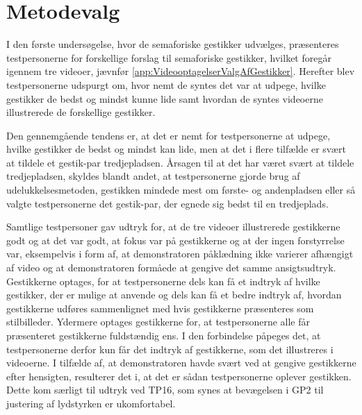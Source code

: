 \section{Metodevalg}
\label{DiskussionMetodevalg}
%
I den første undersøgelse, hvor de semaforiske gestikker udvælges, præsenteres testpersonerne for forskellige forslag til semaforiske gestikker, hvilket foregår igennem tre videoer, jævnfør \autoref{app:VideooptagelserValgAfGestikker}. Herefter blev testpersonerne udspurgt om, hvor nemt de syntes det var at udpege, hvilke gestikker de bedst og mindst kunne lide samt hvordan de syntes videoerne illustrerede de forskellige gestikker.

Den gennemgående tendens er, at det er nemt for testpersonerne at udpege, hvilke gestikker de bedst og mindst kan lide, men at det i flere tilfælde er svært at tildele et gestik-par tredjepladsen. Årsagen til at det har været svært at tildele tredjepladsen, skyldes blandt andet, at testpersonerne gjorde brug af udelukkelsesmetoden, gestikken mindede mest om første- og andenpladsen eller så valgte testpersonerne det gestik-par, der egnede sig bedst til en tredjeplads. 

Samtlige testpersoner gav udtryk for, at de tre videoer illustrerede gestikkerne godt og at det var godt, at fokus var på gestikkerne og at der ingen forstyrrelse var, eksempelvis i form af, at demonstratoren påklædning ikke varierer afhængigt af video og at demonstratoren formåede at gengive det samme ansigtsudtryk. Gestikkerne optages, for at testpersonerne dels kan få et indtryk af hvilke gestikker, der er mulige at anvende og dels kan få et bedre indtryk af, hvordan gestikkerne udføres sammenlignet med hvis gestikkerne præsenteres som stilbilleder. Ydermere optages gestikkerne for, at testpersonerne alle får præsenteret gestikkerne fuldstændig ens. I den forbindelse påpeges det, at testpersonerne derfor kun får det indtryk af gestikkerne, som det illustreres i videoerne. I tilfælde af, at demonstratoren havde svært ved at gengive gestikkerne efter hensigten, resulterer det i, at det er sådan testpersonerne oplever gestikken. Dette kom særligt til udtryk ved TP16, som synes at bevægelsen i GP2 til justering af lydstyrken er ukomfortabel. 

